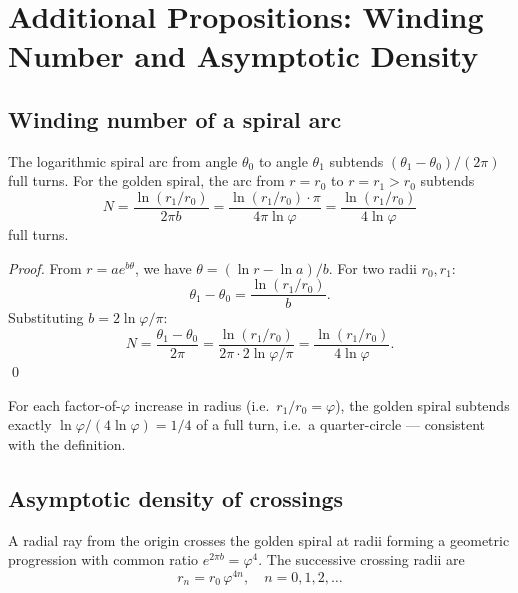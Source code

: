 \section{Additional Propositions: Winding Number and Asymptotic
  Density}
\label{sec:17-winding}

\subsection{Winding number of a spiral arc}
\label{subsec:17-winding-number}

\begin{proposition}
\label{prop:winding}
The logarithmic spiral arc from angle \(\theta_0\) to angle
\(\theta_1\) subtends \((\theta_1-\theta_0)/(2\pi)\) full turns.
For the golden spiral, the arc from \(r = r_0\) to
\(r = r_1 > r_0\) subtends
\[
  N = \frac{\ln(r_1/r_0)}{2\pi b}
    = \frac{\ln(r_1/r_0)\cdot\pi}{4\pi\ln\varphi}
    = \frac{\ln(r_1/r_0)}{4\ln\varphi}
\]
full turns.
\end{proposition}

\begin{proof}
From \(r = ae^{b\theta}\), we have \(\theta = (\ln r - \ln a)/b\).
For two radii \(r_0, r_1\):
\[
  \theta_1 - \theta_0 = \frac{\ln(r_1/r_0)}{b}.
\]
Substituting \(b = 2\ln\varphi/\pi\):
\[
  N = \frac{\theta_1-\theta_0}{2\pi}
    = \frac{\ln(r_1/r_0)}{2\pi \cdot 2\ln\varphi/\pi}
    = \frac{\ln(r_1/r_0)}{4\ln\varphi}.
\]
\qed
\end{proof}

\begin{corollary}
For each factor-of-\(\varphi\) increase in radius (i.e.\
\(r_1/r_0 = \varphi\)), the golden spiral subtends exactly
\(\ln\varphi/(4\ln\varphi) = 1/4\) of a full turn, i.e.\ a
quarter-circle — consistent with the definition.
\end{corollary}

\subsection{Asymptotic density of crossings}
\label{subsec:17-density}

\begin{proposition}
\label{prop:radial-density}
A radial ray from the origin crosses the golden spiral
at radii forming a geometric progression with common ratio
\(e^{2\pi b} = \varphi^4\).  The successive crossing radii are
\[
  r_n = r_0\,\varphi^{4n}, \quad n = 0, 1, 2, \ldots
\]
\end{proposition}

